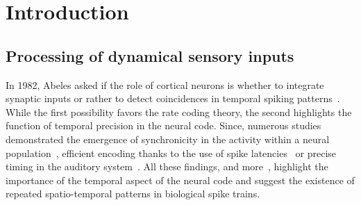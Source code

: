 \documentclass[default]{sn-jnl}%
\theoremstyle{thmstyleone}%
\theoremstyle{thmstyletwo}%
\theoremstyle{thmstylethree}%
\begin{document}
\title[\ShortTitle]{\Title}
%

\author*{ }

\author{ }


%
%
%
%


\abstract{
\Abstract
}


%
%
%
\keywords{\Keywords}
%
\maketitle
\section{Introduction}
\label{sec:intro}
%
\subsection{Processing of dynamical sensory inputs}
In 1982, Abeles asked if the role of cortical neurons is whether to integrate synaptic inputs or rather to detect coincidences in temporal spiking patterns~\citep{abeles_role_1982}. While the first possibility favors the rate coding theory, the second highlights the function of temporal precision in the neural code. Since, numerous studies demonstrated the emergence of synchronicity in the activity within a neural population~\citep{riehle_spike_1997, davis_spontaneous_2021}, efficient encoding thanks to the use of spike latencies~\citep{perrinet_coding_2004, gollisch_rapid_2008} or precise timing in the auditory system~\citep{deweese_binary_2002, carr_circuit_1990}. All these findings, and more~\citep{bohte_evidence_2004}, highlight the importance of the temporal aspect of the neural code and suggest the existence of repeated spatio-temporal patterns in biological spike trains.
\end{document}
